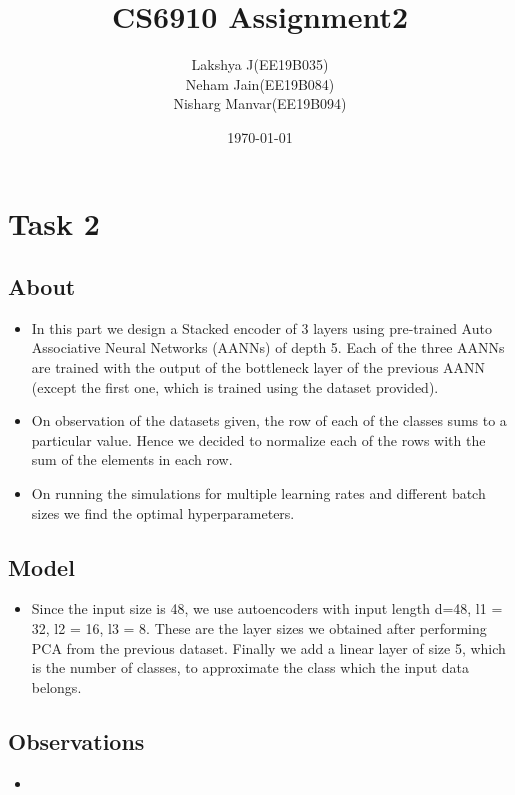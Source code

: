 \documentclass{article}
\title{CS6910 Assignment2}
\author{Lakshya J(EE19B035)\\ Neham Jain(EE19B084)\\ Nisharg Manvar(EE19B094)}
\date{\today}
\begin{document}
\maketitle

\section{Task 2}
\subsection{About}
\begin{itemize}
    \item In this part we design a Stacked encoder of 3 layers using pre-trained Auto Associative Neural Networks (AANNs) of depth 5. Each of the three AANNs are trained with the output of the bottleneck layer of the previous AANN (except the first one, which is trained using the dataset provided).
    \item On observation of the datasets given, the row of each of the classes sums to a particular value. Hence we decided to normalize each of the rows with the sum of the elements in each row.
    \item On running the simulations for multiple learning rates and different batch sizes we find the optimal hyperparameters.
\end{itemize}

\subsection{Model}
\begin{itemize}
    \item Since the input size is 48, we use autoencoders with input length d=48, l1 = 32, l2 = 16, l3 = 8. These are the layer sizes we obtained after performing PCA from the previous dataset. Finally we add a linear layer of size 5, which is the number of classes, to approximate the class which the input data belongs.
\end{itemize}

\subsection{Observations}
\begin{itemize}
    \item 
\end{itemize}
\end{document}
